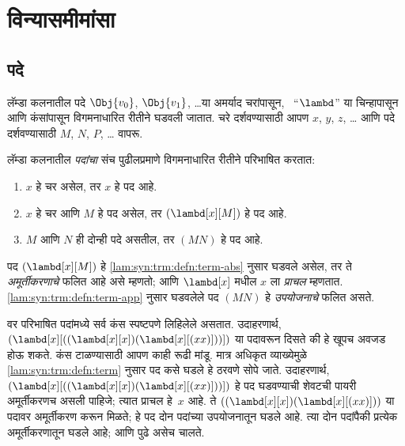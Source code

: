 \chapter{विन्यासमीमांसा}\label{lam:syn:chap}








\section{पदे}\label{lam:syn:trm:sec}

लॅम्डा कलनातील पदे $\Obj{v_0}$, $\Obj{v_1}$, \dots या
अमर्याद चरांपासून, ~“$\lambd$” या चिन्हापासून आणि कंसांपासून
विगमनाधारित रीतीने घडवली जातात. चरे दर्शवण्यासाठी आपण
$x$, $y$, $z$, \dots{} आणि पदे दर्शवण्यासाठी
$M$, $N$, $P$, \dots{} वापरू.

\begin{defn}[पदे] \label{lam:syn:trm:defn:term}
लॅम्डा कलनातील \emph{पदांचा} संच पुढीलप्रमाणे
विगमनाधारित रीतीने परिभाषित करतात:
\begin{enumerate}
  \item \label{lam:syn:trm:defn:term-var} $x$ हे चर असेल, तर $x$ हे
    पद आहे.
  \item \label{lam:syn:trm:defn:term-abs} $x$ हे चर आणि $M$ हे
    पद असेल, तर $(\lambd[x][M])$ हे पद आहे.
  \item \label{lam:syn:trm:defn:term-app} $M$ आणि $N$ ही दोन्ही
    पदे असतील, तर $(MN)$ हे पद आहे.
\end{enumerate}
\end{defn}

पद $(\lambd[x][M])$ हे \ref{lam:syn:trm:defn:term-abs} नुसार
घडवले असेल, तर ते \emph{अमूर्तीकरणाचे} फलित आहे
असे म्हणतो; आणि $\lambd[x]$ मधील $x$ ला
\emph{प्राचल} म्हणतात. \ref{lam:syn:trm:defn:term-app}
नुसार घडवलेले पद $(MN)$ हे \emph{उपयोजनाचे}
फलित असते.

वर परिभाषित पदांमध्ये सर्व कंस स्पष्टपणे लिहिलेले
असतात. उदाहरणार्थ,
$(\lambd[x][((\lambd[x][x])(\lambd[x][(xx)]))])$
या पदावरून दिसते की हे खूपच अवजड होऊ शकते. कंस
टाळण्यासाठी आपण काही रूढी मांडू. मात्र अधिकृत
व्याख्येमुळे \ref{lam:syn:trm:defn:term} नुसार पद कसे
घडले हे ठरवणे सोपे जाते. उदाहरणार्थ,
$(\lambd[x][((\lambd[x][x])(\lambd[x][(xx)]))])$
हे पद घडवण्याची शेवटची पायरी अमूर्तीकरणच असली
पाहिजे; त्यात प्राचल हे~$x$ आहे.
ते $((\lambd[x][x])(\lambd[x][(xx)]))$ या पदावर
अमूर्तीकरण करून मिळते; हे पद दोन पदांच्या
उपयोजनातून घडले आहे. त्या दोन पदांपैकी प्रत्येक
अमूर्तीकरणातून घडले आहे; आणि पुढे असेच चालते.

